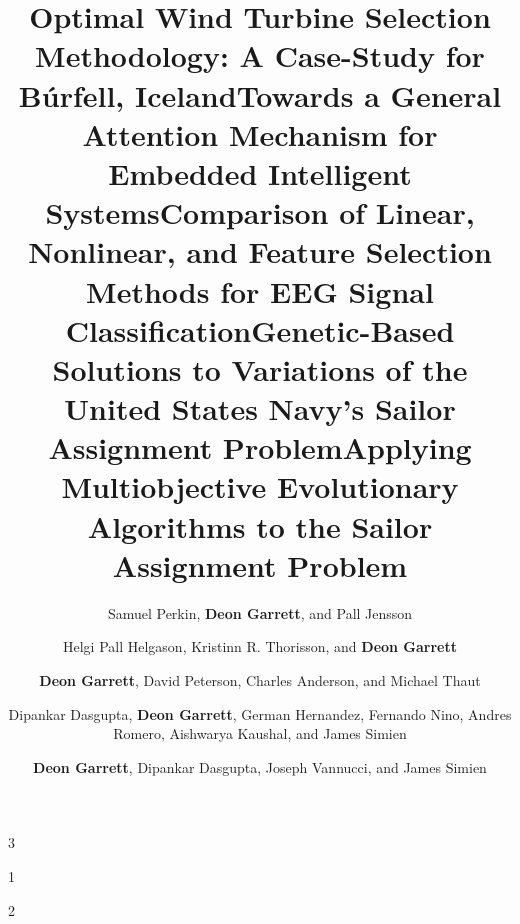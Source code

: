 \documentclass[a4paper,10pt]{cvclean}
\begin{document}
\begin{publications}
  \begin{journalarticles}
    \begin{paper}
      \title{Optimal Wind Turbine Selection Methodology: A Case-Study for
        Búrfell, Iceland}
      \author{Samuel Perkin, \textbf{Deon Garrett}, and Pall Jensson}
	  \num{3}
    \end{paper}
    \begin{paper}
      \title{Towards a General Attention Mechanism for Embedded Intelligent
        Systems}
      \author{Helgi Pall Helgason, Kristinn R. Thorisson, and \textbf{Deon
          Garrett}}
      \num{1}
    \end{paper}
    \begin{paper}
      \title{Comparison of Linear, Nonlinear, and Feature Selection Methods for
        EEG Signal Classification}
      \author{\textbf{Deon Garrett}, David Peterson, Charles Anderson, and Michael Thaut}
      \num{2}
    \end{paper}
  \end{journalarticles}

  \begin{bookchapters}
    \begin{paper}
      \title{Genetic-Based Solutions to Variations of the United States Navy's
        Sailor Assignment Problem}
      \author{Dipankar Dasgupta, \textbf{Deon Garrett}, German Hernandez, Fernando Nino,
        Andres Romero, Aishwarya Kaushal, and James Simien}
    \end{paper}
    \begin{paper}
      \title{Applying Multiobjective Evolutionary Algorithms to the Sailor
        Assignment Problem}
      \author{\textbf{Deon Garrett}, Dipankar Dasgupta, Joseph Vannucci, and James
        Simien}
    \end{paper}
  \end{bookchapters}


\end{publications}
\end{document}
